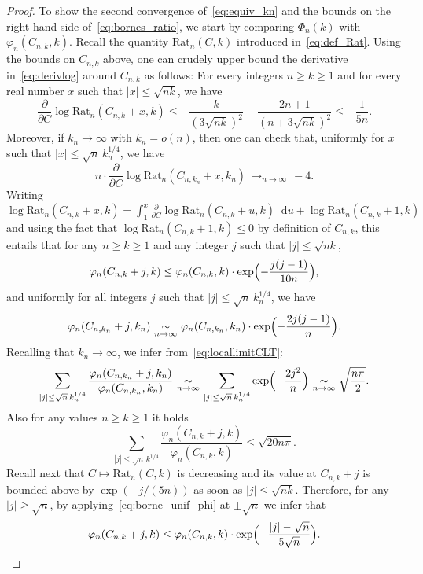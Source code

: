 \documentclass[10pt]{amsart}
\theoremstyle{plain}
\theoremstyle{definition}
\theoremstyle{remark}
\renewcommand{\d}{\mathop{}\!\mathrm{d}}
\newcommand{\cv}[1][n]{\,\mathop{\longrightarrow}^{}_{#1 \to \infty}\,}
\newcommand{\equi}[1][n]{\,\mathop{\sim}^{}_{#1 \to \infty}\,}
\begin{document}
\begin{proof}
To show the second convergence of~\eqref{eq:equiv_kn} and the bounds on the right-hand side of~\eqref{eq:bornes_ratio}, we start by comparing $\Phi_n(k)$ with $\varphi_{n}(C_{n,k},k)$.
Recall the quantity $\mathrm{Rat}_{n}(C,k)$ introduced in~\eqref{eq:def_Rat}.
Using the bounds on $C_{n,k}$ above, one can crudely upper bound the derivative in~\eqref{eq:derivlog} around $C_{n,k}$ as follows: For every integers $n \ge k \ge 1$ and for every real number $x$ such that $|x| \le \sqrt{nk}$, we have
\[
\frac{\partial}{\partial C} \log \mathrm{Rat}_n(C_{n,k}+x,k)
\le - \frac{k}{(3\sqrt{nk})^2}- \frac{2n+1}{(n+3\sqrt{nk})^2}
\le - \frac{1}{5n}.
\]
Moreover, if $k_n \to\infty$ with $k_n = o(n)$, then
one can check that, uniformly for $x$ such that $|x| \leq \sqrt{n}\, k_{n}^{1/4}$, we have
\[
n \cdot \frac{\partial}{\partial C} \log \mathrm{Rat}_n(C_{n,k_{n}}+x,k_{n}) \cv -4.
\]
Writing $ \log \mathrm{Rat}_n(C_{n,k}+x,k) = \int_{1}^{x} \frac{\partial}{\partial C} \log \mathrm{Rat}_n(C_{n,k}+u,k) \d u+\log \mathrm{Rat}_n(C_{n,k}+1,k)$ and using the fact that $\log \mathrm{Rat}_n(C_{n,k}+1,k) \leq 0$ by definition of $C_{n,k}$,
this entails that for any $n \ge k \ge 1$ and any integer $j$ such that $|j| \le \sqrt{nk}$,
\begin{equation} \label{eq:borne_unif_phi}
\varphi_{n}(C_{n,k}+j,k) \le \varphi_{n}(C_{n,k},k) \cdot \exp\Bigl(- \frac{j(j-1)}{10n}\Bigr),
\end{equation}
and uniformly for all integers $j$ such that $|j| \leq \sqrt{n}\, k_{n}^{1/4}$, we have
\begin{equation}\label{eq:locallimitCLT}
\varphi_{n}(C_{n,k_{n}}+j,k_{n}) \equi \varphi_{n}(C_{n,k_{n}},k_{n}) \cdot \exp\Bigl(-\frac{2j(j-1)}{n}\Bigr).
\end{equation}
Recalling that $k_{n} \to \infty$, we infer from~\eqref{eq:locallimitCLT}:
\[
\sum_{|j| \leq \sqrt{n}\,k_{n}^{1/4}} \frac{\varphi_{n}(C_{n,k_{n}}+j,k_{n})}{\varphi_{n}(C_{n,k_{n}},k_{n})}
\equi \sum_{|j| \leq \sqrt{n}\,k_{n}^{1/4}} \exp\Bigl(- \frac{2j^2}{n}\Bigr)
\equi \sqrt{\frac{n \pi}{2}}.
\]
Also for any values $n \ge k \ge 1$ it holds
\[
\sum_{|j| \leq \sqrt{n}\,k^{1/4}} \frac{\varphi_{n}(C_{n,k}+j,k)}{\varphi_{n}(C_{n,k},k)}
\le \sqrt{20 n \pi}.
\]
Recall next that $ C \mapsto \mathrm{Rat}_n(C,k)$ is decreasing and its value at $C_{n,k}+j$ is bounded above by $\exp(-j/(5n))$ as soon as $|j| \le \sqrt{nk}$. Therefore, for any $|j| \ge\sqrt{n}$, by applying~\eqref{eq:borne_unif_phi} at $\pm\sqrt{n}$ we infer that
\[
\varphi_{n}(C_{n,k}+j,k) \le \varphi_{n}(C_{n,k},k) \cdot \exp\Bigl(- \frac{|j|-\sqrt{n}}{5\sqrt{n}}\Bigr).
\]
\end{proof}
\end{document}
